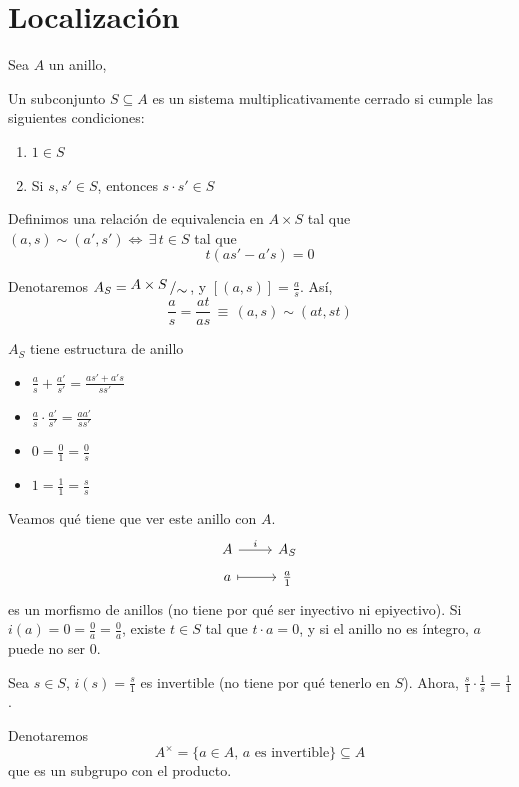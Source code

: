 \chapter{Localizaci\'on} \justifying
Sea $A$ un anillo, 
\begin{defi}
    Un subconjunto $S \subseteq A$ es un sistema multiplicativamente cerrado si cumple las siguientes condiciones: \vspace{-3mm}
    \begin{enumerate}
        \item $1\in S$
        \item Si $s,s'\in S$, entonces $s\cdot s' \in S$
    \end{enumerate}
\end{defi}
Definimos una relaci\'on de equivalencia en $A \times S$ tal que $(a,s) \sim (a',s') \iff \, \exists \, t \in S$ tal que
$$t(as'-a's) = 0$$

Denotaremos $A_S = \modulo{A\times S}{ \sim}$, y $[(a,s)] = \frac{a}{s}$. As\'i,
$$\dfrac{a}{s} = \dfrac{at}{as} \, \equiv \, (a,s) \sim (at,st)$$
\begin{prop}
    $A_S$ tiene estructura de anillo \vspace{-3mm}
    \begin{itemize}
        \item $\frac{a}{s} + \frac{a'}{s'} = \frac{as'+a's}{ss'}$
        \item $\frac{a}{s} \cdot \frac{a'}{s'} = \frac{aa'}{ss'}$
        \item $0=\frac{0}{1} = \frac{0}{s}$
        \item $1=\frac{1}{1} = \frac{s}{s}$
    \end{itemize}
\end{prop}
Veamos qu\'e tiene que ver este anillo con $A$. 
$$\bt A \arrow{r}{i} & A_S \\[-5mm] a \arrow[mapsto]{r} & \frac{a}{1}  \et$$
es un morfismo de anillos (no tiene por qu\'e ser inyectivo ni epiyectivo). Si $i(a)=0=\frac{0}{a}=\frac{0}{a}$, existe $t \in S$ tal que $t\cdot a =0$, y si el anillo no es \'integro, $a$ puede no ser $0$. 

Sea $s \in S$, $i(s)=\frac{s}{1}$ es invertible (no tiene por qu\'e tenerlo en $S$). Ahora, $\frac{s}{1} \cdot \frac{1}{s} = \frac{1}{1}$. 

Denotaremos 
$$A^{\times} = \{ a\in A, \, a \text{ es invertible} \} \subseteq A$$
que es un subgrupo con el producto.

